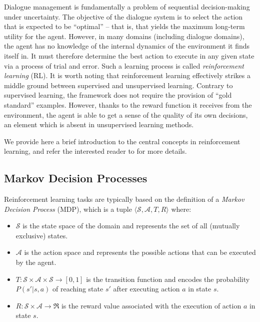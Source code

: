 Dialogue management is fundamentally a problem of sequential decision-making under uncertainty. The objective of the dialogue system is to select the action that is expected to be ``optimal'' -- that is, that yields the maximum long-term utility for the agent. However, in many domains (including dialogue domains), the agent has no knowledge of the internal dynamics of the environment it finds itself in.  It must therefore determine the best action to execute in any given state via a process of trial and error.  Such a learning process is called \textit{reinforcement learning} (RL).  It is worth noting that reinforcement learning effectively strikes a middle ground between supervised and unsupervised learning.  Contrary to supervised learning, the framework does not require the provision of ``gold standard'' examples.  However,  thanks to the reward function it receives from the environment, the agent is able to get a sense of the quality of its own decisions, an element which is absent in unsupervised learning methods.  

We provide here a brief introduction to the central concepts in reinforcement learning, and refer the interested reader to \cite{citeulike:112017} for more details. 

\subsection{Markov Decision Processes}
\label{sec:mdp}

Reinforcement learning tasks are typically based on the definition of a \textit{Markov Decision Process} (MDP), which is a tuple $\langle \mathcal{S}, \mathcal{A}, T, R \rangle$ where:
\begin{itemize}
\item $\mathcal{S}$ is the state space of the domain and represents the set of all (mutually exclusive) states.
\item $\mathcal{A}$ is the action space and represents the possible actions that can be executed by the agent.
\item $T: \mathcal{S} \times \mathcal{A} \times \mathcal{S} \rightarrow [0,1]$ is the transition function and encodes the probability $P(s'|s,a)$ of reaching state $s'$ after executing action $a$ in state $s$.
\item $R:  \mathcal{S} \times \mathcal{A} \rightarrow \Re$ is the reward value associated with the execution of action $a$ in state $s$.
\end{itemize}
 
